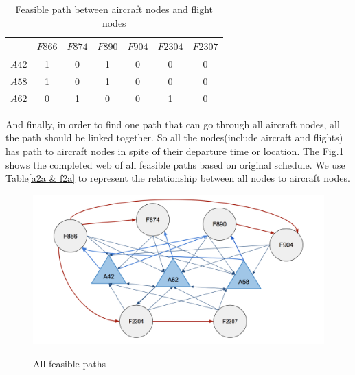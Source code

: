 \documentclass[senior]{IPSstyle}
\begin{document}
\begin{table}[h]
\renewcommand{\arraystretch}{1}
\begin{center}
\begin{tabular}{|c|c|c|c|c|c|c|}
\hline
\multicolumn{1}{|c|}{}
&\multicolumn{1}{|c|}{\(F866\)}
&\multicolumn{1}{c|}{\(F874\)}
&\multicolumn{1}{c|}{\(F890\)}
&\multicolumn{1}{c|}{\(F904\)}
&\multicolumn{1}{c|}{\(F2304\)}
&\multicolumn{1}{c|}{\(F2307\)}
\\  \hline
\(A42\) & 1 & 0 & 1 & 0 & 0 & 0
\\	\hline
\(A58\) & 1 & 0 & 1 & 0 & 0 & 0
\\	\hline
\(A62\) & 0 & 1 & 0 & 0 & 1 & 0
\\  \hline
\end{tabular}
\caption{Feasible path between aircraft nodes and flight nodes}
\label{Example Feasible paths a2f}
\end{center}
\end{table}

And finally, in order to find one path that can go through all aircraft nodes, all the path should be linked together. So all the nodes(include aircraft and flights) has path to aircraft nodes in spite of their departure time or location. The Fig.\ref{fig:all feasible paths} shows the completed web of all feasible paths based on original schedule. 
We use Table\ref{a2a & f2a} to represent the relationship between all nodes to aircraft nodes. 

\begin{figure}[h]
    \centering
    \includegraphics[width = 15cm]{MasterThesis-master/completed-web.png}\\
    \caption{All feasible paths}
    \label{fig:all feasible paths}
\end{figure}
\end{document}
